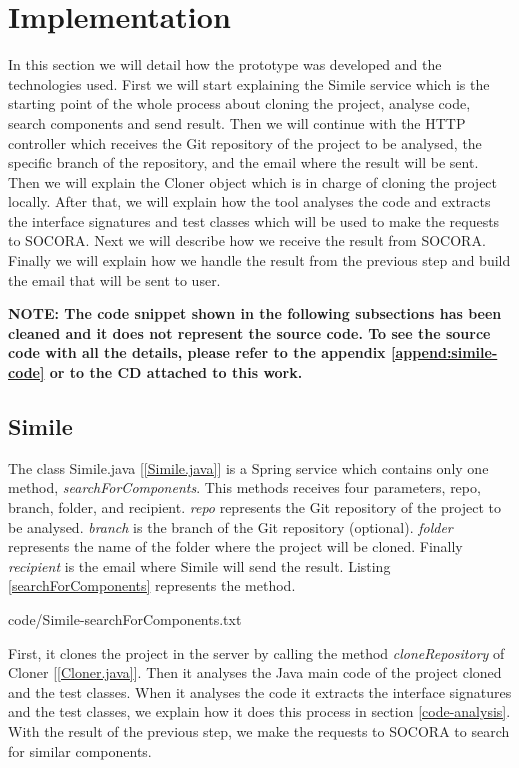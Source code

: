 \section{Implementation}
In this section we will detail how the prototype was developed and the technologies used. First we will start explaining the Simile service which is the starting point of the whole process about cloning the project, analyse code, search components and send result. Then we will continue with the  HTTP controller which receives the Git repository of the project to be analysed, the specific branch of the repository, and the email where the result will be sent. Then we will explain the Cloner object which is in charge of cloning the project locally. After that, we will explain how the tool analyses the code and extracts the interface signatures and test classes which will be used to make the requests to SOCORA. Next we will describe how we receive the result from SOCORA. Finally we will explain how we handle the result from the previous step and build the email that will be sent to user.

\textbf{NOTE: The code snippet shown in the following subsections has been cleaned and it does not represent the source code. To see the source code with all the details, please refer to the appendix \ref{append:simile-code} or to the CD attached to this work.}

\subsection{Simile}
The class Simile.java [\ref{Simile.java}] is a Spring service which contains only one method, \emph{searchForComponents}. This methods receives four parameters, repo, branch, folder, and recipient. \emph{repo} represents the Git repository of the project to be analysed. \emph{branch} is the branch of the Git repository (optional). \emph{folder} represents the name of the folder where the project will be cloned. Finally \emph{recipient} is the email where Simile will send the result. Listing \ref{searchForComponents} represents the method.


{code/Simile-searchForComponents.txt}

First, it clones the project in the server by calling the method \emph{cloneRepository} of Cloner [\ref{Cloner.java}]. Then it analyses the Java main code of the project cloned and the test classes. When it analyses the code it extracts the interface signatures and the test classes, we explain how it does this process in section \ref{code-analysis}. With the result of the previous step, we make the requests to SOCORA to search for similar components.

